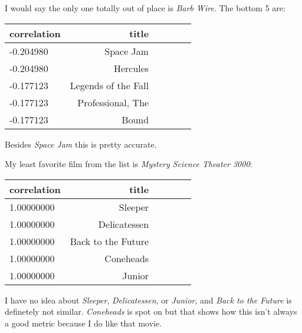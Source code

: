 \documentclass[12pt, a4paper]{article}
\begin{document}
\noindent
I would say the only one totally out of place is \emph{Barb Wire}. The bottom 5 are:

\begin{minipage}{\linewidth} %
\vspace{2em}
\centering
\begin{tabular}{|l|r|r|l|l|l|}
        \hline
        correlation & title\\
        \hline
        -0.204980 & Space Jam\\
        \hline
        -0.204980 & Hercules\\
        \hline
        -0.177123 & Legends of the Fall\\
        \hline
        -0.177123 & Professional, The\\
        \hline
        -0.177123 & Bound\\
        \hline
\end{tabular}
\vspace{2em}
\end{minipage}

Besides \emph{Space Jam} this is pretty accurate.

\newpage
\noindent
My least favorite film from the list is \emph{Mystery Science Theater 3000}:

\begin{minipage}{\linewidth} %
\vspace{2em}
\centering
\begin{tabular}{|l|r|r|l|l|l|}
        \hline
        correlation & title\\
        \hline
        1.00000000 & Sleeper\\
        \hline
        1.00000000 & Delicatessen\\
        \hline
        1.00000000 & Back to the Future\\
        \hline
        1.00000000 & Coneheads\\
        \hline
        1.00000000 & Junior\\
        \hline
\end{tabular}
\vspace{2em}
\end{minipage}

\noindent
I have no idea about \emph{Sleeper}, \emph{Delicatessen}, or \emph{Junior}, and \emph{Back to the Future} is definetely not similar. \emph{Coneheads} is spot on but that shows how this isn't always a good metric because I do like that movie.
\end{document}
